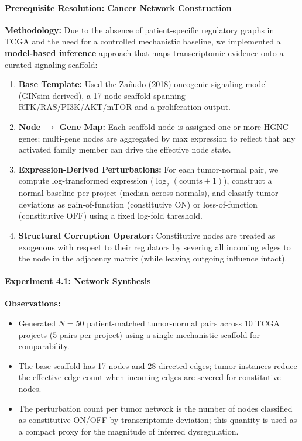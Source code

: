 \paragraph{Prerequisite Resolution: Cancer Network Construction}
\textbf{Methodology:}
Due to the absence of patient-specific regulatory graphs in TCGA and the need for a controlled mechanistic baseline, we implemented a \textbf{model-based inference} approach that maps transcriptomic evidence onto a curated signaling scaffold:
\begin{enumerate}
    \item \textbf{Base Template:} Used the Zañudo (2018) oncogenic signaling model (GINsim-derived), a 17-node scaffold spanning RTK/RAS/PI3K/AKT/mTOR and a proliferation output.
    \item \textbf{Node $\rightarrow$ Gene Map:} Each scaffold node is assigned one or more HGNC genes; multi-gene nodes are aggregated by max expression to reflect that any activated family member can drive the effective node state.
    \item \textbf{Expression-Derived Perturbations:} For each tumor-normal pair, we compute log-transformed expression ($\log_2(\mathrm{counts}+1)$), construct a normal baseline per project (median across normals), and classify tumor deviations as gain-of-function (constitutive ON) or loss-of-function (constitutive OFF) using a fixed log-fold threshold.
    \item \textbf{Structural Corruption Operator:} Constitutive nodes are treated as exogenous with respect to their regulators by severing all incoming edges to the node in the adjacency matrix (while leaving outgoing influence intact).
\end{enumerate}

\paragraph{Experiment 4.1: Network Synthesis}
\textbf{Observations:}
\begin{itemize}
    \item Generated $N=50$ patient-matched tumor-normal pairs across 10 TCGA projects (5 pairs per project) using a single mechanistic scaffold for comparability.
    \item The base scaffold has 17 nodes and 28 directed edges; tumor instances reduce the effective edge count when incoming edges are severed for constitutive nodes.
    \item The perturbation count per tumor network is the number of nodes classified as constitutive ON/OFF by transcriptomic deviation; this quantity is used as a compact proxy for the magnitude of inferred dysregulation.
\end{itemize}

